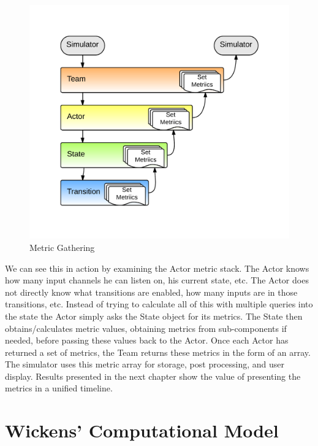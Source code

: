 \begin{figure}[h]
\begin{center}
\includegraphics[width=6in]{metric_gathering.png}
\caption{Metric Gathering}
\label{fig:metric_gathering}
\end{center}
\end{figure}


We can see this in action by examining the Actor metric stack.  The Actor knows how many input channels he can listen on, his current state, etc.  The Actor does not directly know what transitions are enabled, how many inputs are in those transitions, etc.  Instead of trying to calculate all of this with multiple queries into the state the Actor simply asks the State object for its metrics.  The State then obtains/calculates metric values, obtaining metrics from sub-components if needed, before passing these values back to the Actor.  Once each Actor has returned a set of metrics, the Team returns these metrics in the form of an array.  The simulator uses this metric array for storage, post processing, and user display.  Results presented in the next chapter show the value of presenting the metrics in a unified timeline.



\section{Wickens' Computational Model}

